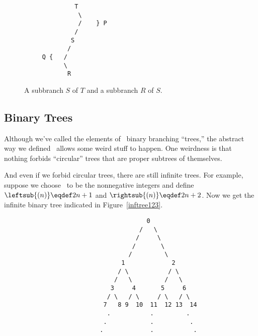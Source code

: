 \begin{definition}

\begin{figure}


\begin{center}
\begin{verbatim}
              T
               \
               /    } P
              /
             S
            /
     Q {   /
           \
            R
\end{verbatim}   
\end{center}

\caption{A subbranch $S$ of $T$ and  a subbranch $R$ of $S$.}

\label{PQdown}

\end{figure}

\subsection{Binary Trees}
Although we've called the elements of \brnch\ binary branching
``trees,'' the abstract way we defined \brnch\ allows some weird stuff
to happen.  One weirdness is that nothing forbids ``circular'' trees
that are proper subtrees of themselves.
\iffalse
For example, it is entirely
possible that there is a structure $T \in \brnch$ such that
\textcolor{red}{
\[
\leftsub{(T)} = T = \rightsub{(T)}.
\]}

This weird binary branching structure doesn't even have any leaves.
\fi
And even if we forbid circular trees, there are still infinite
trees.  For example, suppose we choose \brnch\ to be the nonnegative
integers and define $\leftsub{(n)} \eqdef 2n+1$ and $\rightsub{(n)} \eqdef
2n+2$.  Now we get the infinite binary tree indicated in
Figure~\ref{inftree123}.


\begin{figure}


\begin{verbatim}
                                  0
                                /   \
                               /     \
                              /       \
                             /         \
                           1             2
                          / \           / \
                         /   \         /   \
                        3     4       5     6
                       / \   / \     / \   / \
                      7   8 9  10  11  12 13  14
                       .           .         . 
                      .            .          .
                     .             .           . 
\end{verbatim}


\end{figure}
\end{definition}
